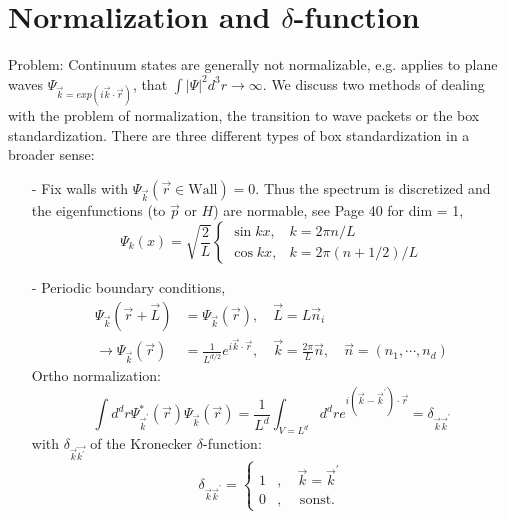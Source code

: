 \section{Normalization and $\delta$-function}
Problem: Continuum states are generally not normalizable, e.g. applies to plane waves $\Psi_{\vec{k}=exp(i\vec{k}\cdot\vec{r})}$, that $\int|\Psi|^2d^3r\to\infty$. We discuss two methods of dealing with the problem of normalization, the transition to wave packets or the box standardization. There are three different types of box standardization in a broader sense:
\begin{itemize}
    \item[-] Fix walls with $\Psi_{\vec{k}}(\vec{r}\in\text{Wall})=0$. Thus the spectrum is discretized and the eigenfunctions (to $\vec{p}$ or $H$) are normable, see Page 40 for dim = 1,
    \begin{equation}
    \Psi_{k}(x)=\sqrt{\frac{2}{L}}\left\{\begin{array}{ll}{\sin k x,} & {k=2 \pi n / L} \\ {\cos k x,} & {k=2 \pi(n+1 / 2) / L}\end{array}\right.
    \end{equation}
    \item[-] Periodic boundary conditions,
    \begin{equation}
    \begin{aligned} \Psi_{\vec{k}}(\vec{r}+\vec{L}) &=\Psi_{\vec{k}}(\vec{r}), \quad \vec{L}=L \vec{n}_{i} \\ \rightarrow \Psi_{\vec{k}}(\vec{r}) &=\frac{1}{L^{d / 2}} e^{i \vec{k} \cdot \vec{r}}, \quad \vec{k}=\frac{2 \pi}{L} \vec{n}, \quad \vec{n}=\left(n_{1}, \cdots, n_{d}\right) \end{aligned}
    \end{equation}
    Ortho normalization:
    \begin{equation}
        \int d^{d} r \Psi_{\vec{k}^{\prime}}^{*}(\vec{r}) \Psi_{\vec{k}}(\vec{r})=\frac{1}{L^{d}} \int_{V=L^{d}} d^{d} r e^{i\left(\vec{k}-\vec{k}^{\prime}\right) \cdot \vec{r}}=\delta_{\vec{k} \vec{k}^{\prime}}
        \end{equation}
        with $\delta_{\vec{k}\vec{k^{\prime}}}$ of the Kronecker $\delta$-function:
        \begin{equation}
        \delta_{\vec{k} \vec{k}^{\prime}}=\left\{\begin{array}{ll}{1} & {, \quad \vec{k}=\vec{k}^{\prime}} \\ {0} & {, \quad \text { sonst. }}\end{array}\right.

\end{equation}
\end{itemize}
